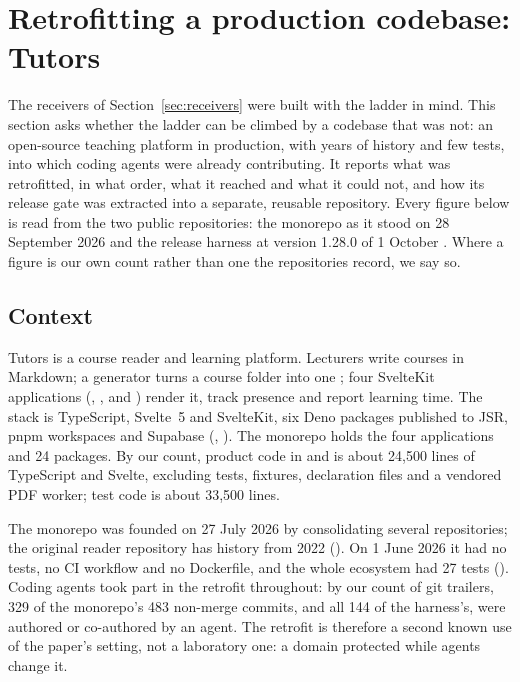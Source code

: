 \section{Retrofitting a production codebase: Tutors}\label{sec:tutors}

The receivers of Section~\ref{sec:receivers} were built with the ladder in mind. This section asks
whether the ladder can be climbed by a codebase that was not: an open-source teaching platform in
production, with years of history and few tests, into which coding agents were already
contributing. It reports what was retrofitted, in what order, what it reached and what it could
not, and how its release gate was extracted into a separate, reusable repository. Every figure
below is read from the two public repositories: the monorepo as it stood on 28 September 2026
\citep{tutorsmonorepo} and the release harness at version 1.28.0 of 1 October
\citep{tutorsreleaseharness}. Where a figure is our own count rather than one the repositories
record, we say so.

\subsection{Context}

Tutors is a course reader and learning platform. Lecturers write courses in Markdown; a
generator turns a course folder into one ; four SvelteKit applications
(, ,  and ) render it, track presence and
report learning time. The stack is TypeScript, Svelte~5 and SvelteKit, six Deno packages
published to JSR, pnpm workspaces and Supabase (, ). The
monorepo holds the four applications and 24 packages. By our count, product code in
 and  is about 24,500 lines of TypeScript and Svelte, excluding
tests, fixtures, declaration files and a vendored PDF worker; test code is about 33,500 lines.

The monorepo was founded on 27 July 2026 by consolidating several repositories; the
original reader repository has history from 2022 (). On 1 June 2026 it had no tests, no CI workflow and no Dockerfile, and
the whole ecosystem had 27 tests (). Coding agents took part in
the retrofit throughout: by our count of git trailers, 329 of the monorepo's 483 non-merge
commits, and all 144 of the harness's, were authored or co-authored by an agent. The
retrofit is therefore a second known use of the paper's setting, not a laboratory one: a
domain protected while agents change it.

